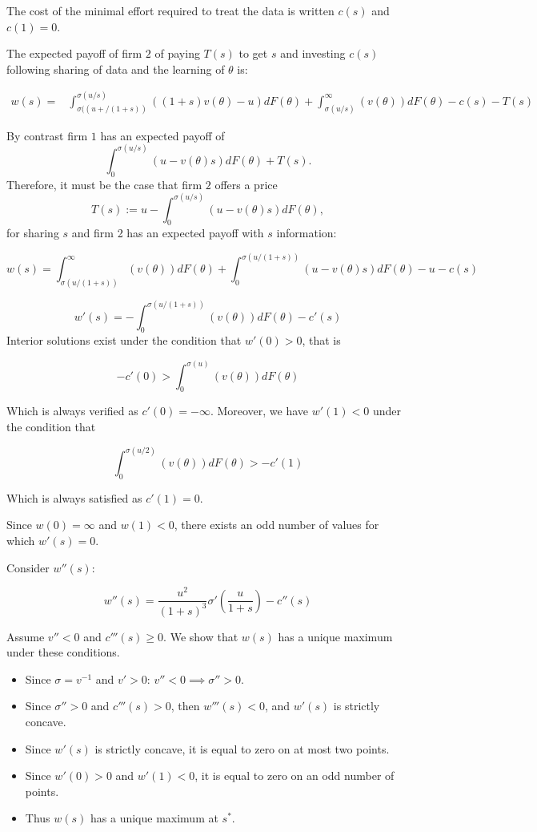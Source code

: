 \documentclass[a4paper,leqno]{article}%
\renewcommand{\t}{\theta}
\renewcommand{\t}{\theta}
\newcommand{\s}{\sigma}
\begin{document}
The cost of the minimal effort required to treat the data is written $c(s)$ and $c(1)=0$. 

The expected payoff of firm $2$ of paying $T(s)$ to get $s$ and investing $c(s)$ following sharing of data and the learning of $\t$ is:
%


\begin{equation}
    \begin{aligned}
w(s)=&\int_{\s((u+/(1+s))}^{\s(u/s)} ((1+s)v(\t)-u)dF(\t)+\int_{\s(u/s)}^\infty (v(\t))dF(\t)-c(s)-T(s)
\end{aligned}
\end{equation}

By contrast firm $1$ has an expected payoff of 
\begin{equation}\label{value-merger-firm1}
    \int_{0}^{\s(u/s)}(u-v(\t)s)dF(\t)+T(s).
\end{equation}
%
Therefore, it must be the case that firm $2$ offers a price
%
\[
T(s):=u-\int_{0}^{\s(u/s)}(u-v(\t)s)dF(\t),
\]
%
for sharing $s$ and firm 2 has an expected payoff with $s$ information:


\[
w(s)=\int_{\s(u/(1+s))}^\infty (v(\t))dF(\t)+\int_{0}^{\s(u/(1+s))}(u-v(\t)s)dF(\t)-u-c(s)
\]

\[
w'(s)=-\int_{0}^{\s(u/(1+s))}(v(\t))dF(\t)-c'(s)
\]
Interior solutions exist under the condition that $w'(0)>0$, that is

\[
-c'(0)>\int_{0}^{\s(u)}(v(\t))dF(\t)
\]

Which is always verified as $c'(0)=-\infty$. Moreover, we have $w'(1)<0$ under the condition that

\[
\int_{0}^{\s(u/2)}(v(\t))dF(\t)> -c'(1)
\]


Which is always satisfied as $c'(1)=0$.

%

Since $w(0)=\infty$ and $w(1)<0$, there exists an odd number of values for which $w'(s)=0$. 

Consider $w''(s)$:

\[
w''(s)=\frac{u^2}{(1+s)^3}\s'(\frac{u}{1+s})-c''(s)
\]

\medskip 

Assume $v''<0$ and $c'''(s)\geq0$. We show that $w(s)$ has a unique maximum under these conditions.

\begin{itemize}
    \item Since $\s=v^{-1}$ and $v'>0$: $v''<0\implies \s''>0$.
    \item Since $\s''>0$ and $c'''(s)>0$, then $w'''(s)<0$, and $w'(s)$ is strictly concave.
    \item Since $w'(s)$ is strictly concave, it is equal to zero on at most two points.
    \item Since $w'(0)>0$ and $w'(1)<0$, it is equal to zero on an odd number of points.
    \item Thus $w(s)$ has a unique maximum at $s^*$.
\end{itemize}
\end{document}
